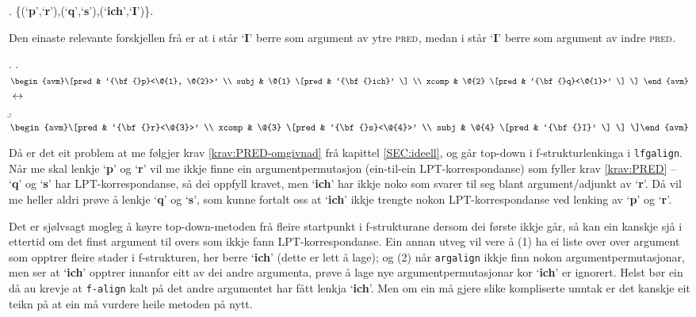 \documentclass[12pt,a4paper,oneside,draft]{report}
\newcommand{\F}[2]{\textsc{#1}\ensuremath{_{#2}}}
\newcommand{\PRED}{\F{pred}{}}
\newcommand{\p}[1]{`\textbf{#1}'}
\begin{document}
\ex. \{(\p{p},\p{r}),(\p{q},\p{s}),(\p{ich},\p{I})\}.

Den einaste relevante forskjellen frå \LLast er at i \LLast står \p{I}
 berre som argument av ytre \PRED{}, medan i \Next står \p{I} berre
 som argument av indre \PRED{}.

{\avmoptions{}
\ex. \a. $\begin{avm}\[pred & `{\bf{}p}<\@{1}, \@{2}>'  \\
     subj & \@{1} \[pred &  `{\bf{}ich}' \] \\
     xcomp & \@{2} \[pred & `{\bf{}q}<\@{1}>' \] \] \end{avm}$
     $\\\\\leftrightarrow$\\
     \b. $\begin{avm}\[pred & `{\bf{}r}<\@{3}>' \\
     xcomp & \@{3} \[pred & `{\bf{}s}<\@{4}>' \\
     subj & \@{4} \[pred &  `{\bf{}I}' \] \] \]\end{avm}$

}

Då er det eit problem at me følgjer krav \ref{krav:PRED-omgivnad} frå
 kapittel \ref{SEC:ideell}, og går top-down i f\hyp{}strukturlenkinga i
 \texttt{lfgalign}. Når me skal lenkje \p{p} og \p{r} vil me ikkje finne ein
 argumentpermutasjon (ein-til-ein LPT\hyp{}korrespondanse) som fyller krav
 \ref{krav:PRED} -- \p{q} og \p{s} har LPT\hyp{}korrespondanse, så dei
 oppfyll kravet, men \p{ich} har ikkje noko som svarer til seg blant
 argument/adjunkt av \p{r}. Då vil me heller aldri prøve å lenkje
 \p{q} og \p{s}, som kunne fortalt oss at \p{ich} ikkje trengte nokon
 LPT\hyp{}korrespondanse ved lenking av \p{p} og \p{r}.

Det er sjølvsagt mogleg å køyre top-down-metoden frå fleire startpunkt
 i f\hyp{}strukturane dersom dei første ikkje går, så kan ein kanskje sjå i
 ettertid om det finst argument til overs som ikkje fann
 LPT\hyp{}korrespondanse. Ein annan utveg vil vere å (1) ha ei liste over
 over argument som opptrer fleire stader i f\hyp{}strukturen, her berre
 \p{ich} (dette er lett å lage); og (2) når \texttt{argalign} ikkje finn
 nokon argumentpermutasjonar, men ser at \p{ich} opptrer innanfor eitt
 av dei andre argumenta, prøve å lage nye argumentpermutasjonar kor
 \p{ich} er ignorert. Helst bør ein då au krevje at \texttt{f-align} kalt på
 det andre argumentet har fått lenkja \p{ich}.  Men om ein må gjere
 slike kompliserte unntak er det kanskje eit teikn på at ein må
 vurdere heile metoden på nytt.
\end{document}
